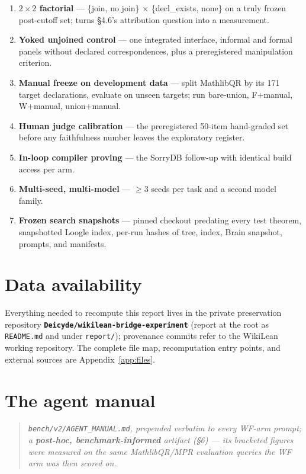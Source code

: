 \documentclass[10pt]{article}
\newcommand{\code}[1]{\texttt{#1}}
\begin{document}
\begin{enumerate}
\item \textbf{$2\times2$ factorial} --- \{join, no join\} $\times$
  \{decl\_exists, none\} on a truly frozen post-cutoff set; turns \S4.6's
  attribution question into a measurement.
\item \textbf{Yoked unjoined control} --- one integrated interface,
  informal and formal panels without declared correspondences, plus a
  preregistered manipulation criterion.
\item \textbf{Manual freeze on development data} --- split MathlibQR by
  its 171 target declarations, evaluate on unseen targets; run bare-union,
  F+manual, W+manual, union+manual.
\item \textbf{Human judge calibration} --- the preregistered 50-item
  hand-graded set before any faithfulness number leaves the exploratory
  register.
\item \textbf{In-loop compiler proving} --- the SorryDB follow-up with
  identical build access per arm.
\item \textbf{Multi-seed, multi-model} --- $\geq$3 seeds per task and a
  second model family.
\item \textbf{Frozen search snapshots} --- pinned checkout predating every
  test theorem, snapshotted Loogle index, per-run hashes of tree, index,
  Brain snapshot, prompts, and manifests.
\end{enumerate}

\section{Data availability}\label{sec:data}

Everything needed to recompute this report lives in the private
preservation repository \textbf{\code{Deicyde/wikilean-bridge-experiment}}
(report at the root as \code{README.md} and under \code{report/});
provenance commits refer to the WikiLean working repository. The complete
file map, recomputation entry points, and external sources are
Appendix~\ref{app:files}.

\appendix

\section{The agent manual}\label{app:manual}

\begin{quote}\itshape\small
\code{bench/v2/AGENT\_MANUAL.md}, prepended verbatim to every WF-arm
prompt; a \textbf{post-hoc, benchmark-informed} artifact (\S6) --- its
bracketed figures were measured on the same MathlibQR/MPR evaluation
queries the WF arm was then scored on.
\end{quote}
\end{document}
